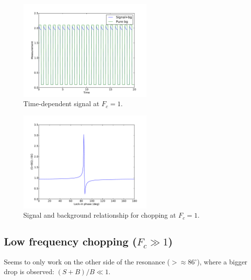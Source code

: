 \documentclass[10pt,a4paper]{article}
\begin{document}
\begin{figure}[h]
\centering
\includegraphics[width=0.6\textwidth]{figures/cpt01a.pdf}
\caption{Time-dependent signal at $F_c = 1$.}
\label{fig:choptime1}
\end{figure}
\begin{figure}[h]
\centering
\includegraphics[width=0.6\textwidth]{figures/cpt01b.pdf}
\caption{Signal and background relationship for chopping at $F_c = 1$.}
\label{fig:chopphase1}
\end{figure}


\subsection{Low frequency chopping ($F_c \gg 1$)}
  Seems to only work on the other side of the resonance ($> \approx 86^{\circ}$), where a bigger drop is observed: $(S + B) / B \ll 1$.
\end{document}
